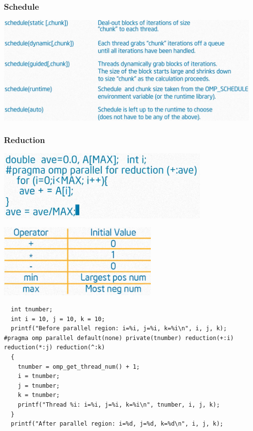 \documentclass{beamer}
\begin{document}
\begin{frame}
  \frametitle{Schedule}
  \includegraphics[width=\textwidth]{schedule}  
\end{frame}


\begin{frame}
  \frametitle{Reduction}
  \centering
  \includegraphics[width=0.8\textwidth]{reduction} \pause
  
  \includegraphics[width=0.6\textwidth]{reduction-init}    
\end{frame}


\begin{frame}
\scriptsize
\lstset{language=C++}
\begin{lstlisting}
  int tnumber;
  int i = 10, j = 10, k = 10;
  printf("Before parallel region: i=%i, j=%i, k=%i\n", i, j, k);
#pragma omp parallel default(none) private(tnumber) reduction(+:i) reduction(*:j) reduction(^:k)
  {
    tnumber = omp_get_thread_num() + 1;
    i = tnumber;
    j = tnumber;
    k = tnumber;
    printf("Thread %i: i=%i, j=%i, k=%i\n", tnumber, i, j, k);
  }
  printf("After parallel region: i=%d, j=%d, k=%d\n", i, j, k);
\end{lstlisting}
\end{frame}
\end{document}
